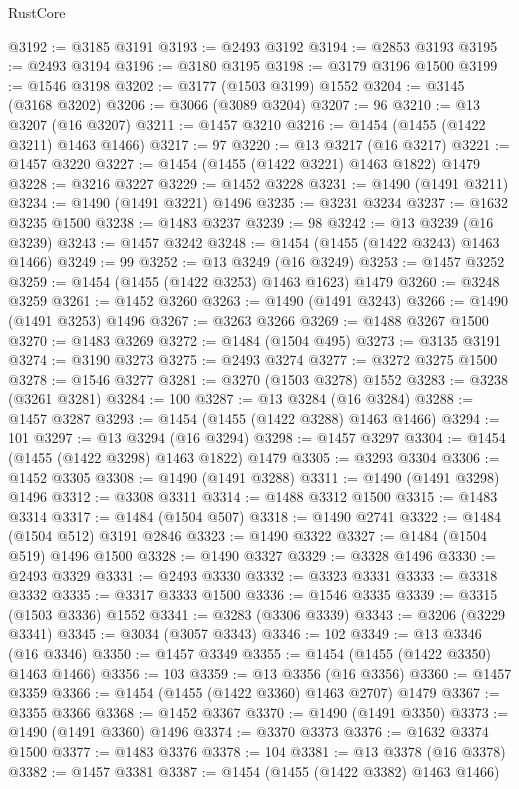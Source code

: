 \begin{lexlean}{RustCore}
\begin{coremodule}
@3192 := @3185 @3191
@3193 := @2493 @3192
@3194 := @2853 @3193
@3195 := @2493 @3194
@3196 := @3180 @3195
@3198 := @3179 @3196 @1500
@3199 := @1546 @3198
@3202 := @3177 (@1503 @3199) @1552
@3204 := @3145 (@3168 @3202)
@3206 := @3066 (@3089 @3204)
@3207 := 96
@3210 := @13 @3207 (@16 @3207)
@3211 := @1457 @3210
@3216 := @1454 (@1455 (@1422 @3211) @1463 @1466)
@3217 := 97
@3220 := @13 @3217 (@16 @3217)
@3221 := @1457 @3220
@3227 := @1454 (@1455 (@1422 @3221) @1463 @1822) @1479
@3228 := @3216 @3227
@3229 := @1452 @3228
@3231 := @1490 (@1491 @3211)
@3234 := @1490 (@1491 @3221) @1496
@3235 := @3231 @3234
@3237 := @1632 @3235 @1500
@3238 := @1483 @3237
@3239 := 98
@3242 := @13 @3239 (@16 @3239)
@3243 := @1457 @3242
@3248 := @1454 (@1455 (@1422 @3243) @1463 @1466)
@3249 := 99
@3252 := @13 @3249 (@16 @3249)
@3253 := @1457 @3252
@3259 := @1454 (@1455 (@1422 @3253) @1463 @1623) @1479
@3260 := @3248 @3259
@3261 := @1452 @3260
@3263 := @1490 (@1491 @3243)
@3266 := @1490 (@1491 @3253) @1496
@3267 := @3263 @3266
@3269 := @1488 @3267 @1500
@3270 := @1483 @3269
@3272 := @1484 (@1504 @495)
@3273 := @3135 @3191
@3274 := @3190 @3273
@3275 := @2493 @3274
@3277 := @3272 @3275 @1500
@3278 := @1546 @3277
@3281 := @3270 (@1503 @3278) @1552
@3283 := @3238 (@3261 @3281)
@3284 := 100
@3287 := @13 @3284 (@16 @3284)
@3288 := @1457 @3287
@3293 := @1454 (@1455 (@1422 @3288) @1463 @1466)
@3294 := 101
@3297 := @13 @3294 (@16 @3294)
@3298 := @1457 @3297
@3304 := @1454 (@1455 (@1422 @3298) @1463 @1822) @1479
@3305 := @3293 @3304
@3306 := @1452 @3305
@3308 := @1490 (@1491 @3288)
@3311 := @1490 (@1491 @3298) @1496
@3312 := @3308 @3311
@3314 := @1488 @3312 @1500
@3315 := @1483 @3314
@3317 := @1484 (@1504 @507)
@3318 := @1490 @2741
@3322 := @1484 (@1504 @512) @3191 @2846
@3323 := @1490 @3322
@3327 := @1484 (@1504 @519) @1496 @1500
@3328 := @1490 @3327
@3329 := @3328 @1496
@3330 := @2493 @3329
@3331 := @2493 @3330
@3332 := @3323 @3331
@3333 := @3318 @3332
@3335 := @3317 @3333 @1500
@3336 := @1546 @3335
@3339 := @3315 (@1503 @3336) @1552
@3341 := @3283 (@3306 @3339)
@3343 := @3206 (@3229 @3341)
@3345 := @3034 (@3057 @3343)
@3346 := 102
@3349 := @13 @3346 (@16 @3346)
@3350 := @1457 @3349
@3355 := @1454 (@1455 (@1422 @3350) @1463 @1466)
@3356 := 103
@3359 := @13 @3356 (@16 @3356)
@3360 := @1457 @3359
@3366 := @1454 (@1455 (@1422 @3360) @1463 @2707) @1479
@3367 := @3355 @3366
@3368 := @1452 @3367
@3370 := @1490 (@1491 @3350)
@3373 := @1490 (@1491 @3360) @1496
@3374 := @3370 @3373
@3376 := @1632 @3374 @1500
@3377 := @1483 @3376
@3378 := 104
@3381 := @13 @3378 (@16 @3378)
@3382 := @1457 @3381
@3387 := @1454 (@1455 (@1422 @3382) @1463 @1466)

\end{coremodule}
\end{lexlean}
